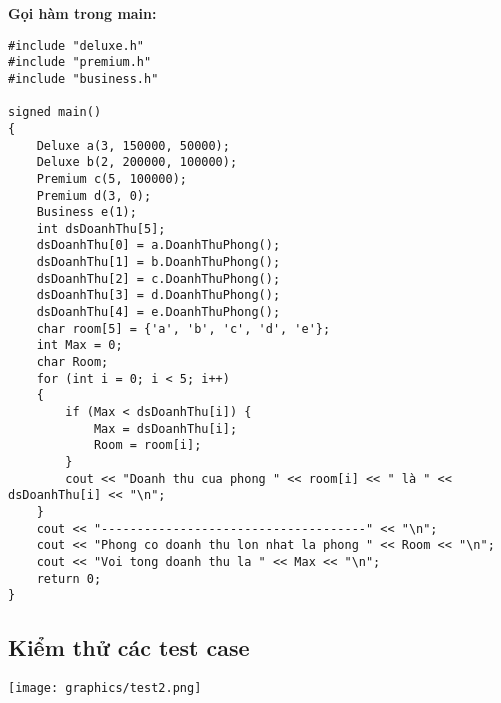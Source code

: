\item{\textbf{Gọi hàm trong main:}}
\begin{verbatim} 
#include "deluxe.h"
#include "premium.h" 
#include "business.h"

signed main()
{
    Deluxe a(3, 150000, 50000);
    Deluxe b(2, 200000, 100000);
    Premium c(5, 100000);
    Premium d(3, 0);
    Business e(1);
    int dsDoanhThu[5];
    dsDoanhThu[0] = a.DoanhThuPhong();
    dsDoanhThu[1] = b.DoanhThuPhong();
    dsDoanhThu[2] = c.DoanhThuPhong();
    dsDoanhThu[3] = d.DoanhThuPhong();
    dsDoanhThu[4] = e.DoanhThuPhong();
    char room[5] = {'a', 'b', 'c', 'd', 'e'};
    int Max = 0;
    char Room;
    for (int i = 0; i < 5; i++) 
    {
        if (Max < dsDoanhThu[i]) {
            Max = dsDoanhThu[i];
            Room = room[i];
        }
        cout << "Doanh thu cua phong " << room[i] << " là " << dsDoanhThu[i] << "\n";
    }
    cout << "-------------------------------------" << "\n";
    cout << "Phong co doanh thu lon nhat la phong " << Room << "\n";
    cout << "Voi tong doanh thu la " << Max << "\n";
    return 0;
}
\end{verbatim}
\subsection{Kiểm thử các test case}
\texttt{[image: graphics/test2.png]}
